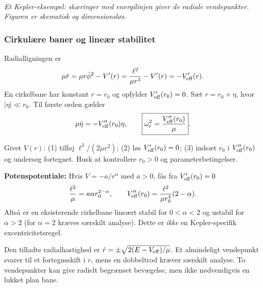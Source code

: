 \begin{center}\\[-1mm]{\small \itshape Et Kepler-eksempel: skæringer med energilinjen giver de radiale vendepunkter. Figuren er skematisk og dimensionsløs.}\end{center}

\subsubsection*{Cirkulære baner og lineær stabilitet}\label{sec:circular}
Radialligningen er
\[\mu\ddot r=\mu r\dot\phi^2-V'(r)=\frac{\ell^2}{\mu r^3}-V'(r)=-V_{\rm eff}'(r).\]
En cirkelbane har konstant $r=r_0$ og opfylder $V_{\rm eff}'(r_0)=0$. Sæt $r=r_0+\eta$, hvor $|\eta|\ll r_0$. Til første orden gælder
\[\mu\ddot\eta=-V_{\rm eff}''(r_0)\eta,\qquad\boxed{\omega_r^2=\frac{V_{\rm eff}''(r_0)}{\mu}}.\]
\begin{method}Givet $V(r)$: (1) tilføj $\ell^2/(2\mu r^2)$; (2) løs $V_{\rm eff}'(r_0)=0$; (3) indsæt $r_0$ i $V_{\rm eff}''(r_0)$ og undersøg fortegnet. Husk at kontrollere $r_0>0$ og parameterbetingelser.\end{method}
\textbf{Potenspotentiale:} Hvis $V=-a/r^{\alpha}$ med $a>0$, fås fra $V_{\rm eff}'(r_0)=0$
\[\frac{\ell^2}{\mu}=a\alpha r_0^{2-\alpha},\qquad V_{\rm eff}''(r_0)=\frac{\ell^2}{\mu r_0^4}(2-\alpha).\]
Altså er en eksisterende cirkelbane lineært stabil for $0<\alpha<2$ og ustabil for $\alpha>2$ (for $\alpha=2$ kræves særskilt analyse). Dette er \emph{ikke} en Kepler-specifik excentricitetsregel.

Den tilladte radialhastighed er $\dot r=\pm\sqrt{2(E-V_{\rm eff})/\mu}$. Et almindeligt vendepunkt svarer til et fortegnsskift i $\dot r$, mens en dobbeltrod kræver særskilt analyse. To vendepunkter kan give radielt begrænset bevægelse, men ikke nødvendigvis en lukket plan bane.

